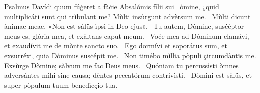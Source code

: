 {Psalmus Davídi quum fúġeret a fàċie Absalómis fílii sui}
{%
~òmine, ¿quid multiplicáti sunt qui trìbulant me? Mùlti insùrgunt advèrsum me.
~Mùlti dicunt ànimae meae, «Non est sàlüs ìpsi in Deo ejus».
~Tu autem, Dòmine, susċèptor meus es, glória mea, et exàltans caput meum.
~Voċe mea ad Dòminum clamávi, et exaudívit me de mònte sancto suo.
~Ego dormívi et soporátus sum, et exsurréxi, quia Dòminus susċépit me.
~Non timébo mìllia pòpuli çircumdàntïs me. Exsùrge Dòmine; sàlvum me fac Deus meus.
~Quóniam tu percussìsti òmnes adversàntes mìhi sine causa; dèntes peccatórum contrivìsti.
~Dòmini est sàlüs, et super pòpulum tuum benedìcçio tua.
}
